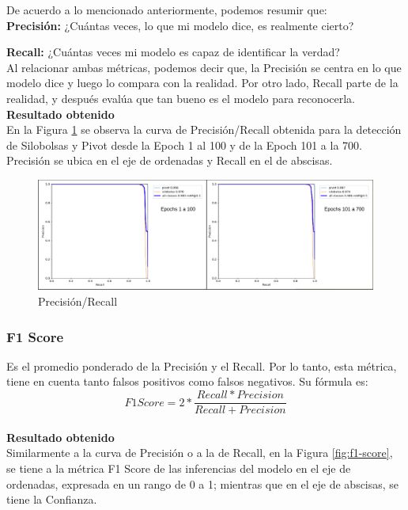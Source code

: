 De acuerdo a lo mencionado anteriormente, podemos resumir que:\\

\textbf{Precisión:} ¿Cuántas veces, lo que mi modelo dice, es realmente cierto?

\textbf{Recall:} ¿Cuántas veces mi modelo es capaz de identificar la verdad?\\

Al relacionar ambas métricas, podemos decir que, la Precisión se centra en lo que modelo dice y luego lo compara con la realidad. Por otro lado, Recall parte de la realidad, y después evalúa que tan bueno es el modelo para reconocerla.\\
 
\textbf{Resultado obtenido}\\

En la Figura \ref{fig:precision/recall} se observa la curva de Precisión/Recall obtenida para la detección de Silobolsas y Pivot desde la Epoch 1 al 100 y de la Epoch 101 a la 700. Precisión se ubica en el eje de ordenadas y Recall en el de abscisas.\\

\begin{figure}[h!]
    \centering
    \includegraphics[width=1\textwidth]{img/Precision-Recall.png}
    \caption{Precisión/Recall}
    \label{fig:precision/recall}
\end{figure}

\newpage
\subsubsection{F1 Score}
Es el promedio ponderado de la Precisión y el Recall. Por lo tanto, esta métrica, tiene en cuenta tanto falsos positivos como falsos negativos. Su fórmula es:   \[F1 Score=2*\frac{Recall * Precision}{Recall + Precision}\] \\


\textbf{Resultado obtenido}\\

Similarmente a la curva de Precisión o a la de Recall, en la Figura \ref{fig:f1-score}, se tiene a la métrica F1 Score de las inferencias del modelo en el eje de ordenadas, expresada en un rango de 0 a 1; mientras que en el eje de abscisas, se tiene la Confianza.

